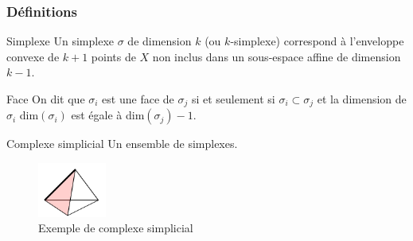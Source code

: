 \documentclass{beamer}
\begin{document}
\begin{frame}
    \frametitle{Définitions}
    \begin{block}{Simplexe}
        Un simplexe $\sigma$ de dimension $k$ (ou $k$-simplexe) correspond à l'enveloppe convexe de $k+1$ points de $X$ non inclus dans un sous-espace affine de dimension $k-1$.
    \end{block}

    \begin{block}{Face}
        On dit que $\sigma_i$ est une face de $\sigma_j$ si et seulement si $\sigma_i \subset \sigma_j$ et la dimension de $\sigma_i$ dim$(\sigma_i)$ est égale à dim$(\sigma_j) - 1$.
    \end{block}

    \begin{block}{Complexe simplicial}
        Un ensemble de simplexes.
    \end{block}

    \begin{figure}
        \includegraphics[width=0.2\textwidth]{../images/SimpFaceCompl.png}
        \centering
        \caption{Exemple de complexe simplicial}
    \end{figure}
    
\end{frame}
\end{document}
